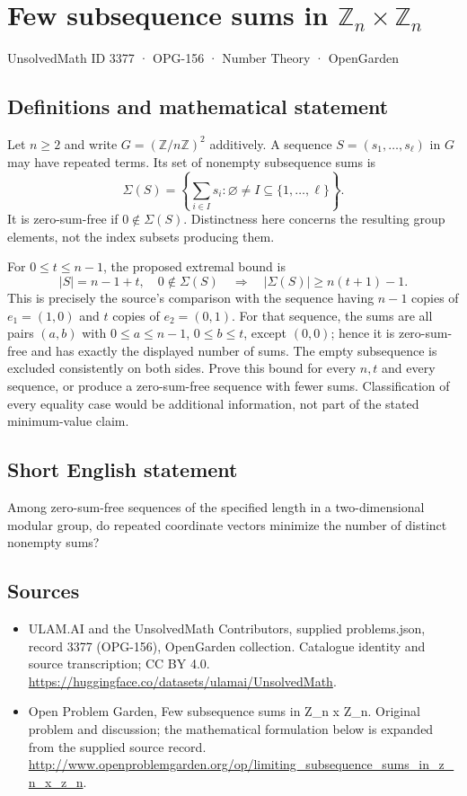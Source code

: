 \documentclass[11pt,a4paper]{article}
\begin{document}
\section*{Few subsequence sums in $\mathbb Z_n\times\mathbb Z_n$}\label{3377}
{\small UnsolvedMath ID 3377 · OPG-156 · Number Theory · OpenGarden}
\subsection{Definitions and mathematical statement}
Let $n\ge2$ and write $G=(\mathbb Z/n\mathbb Z)^2$ additively.
A sequence $S=(s_1,\ldots,s_\ell)$ in $G$ may have repeated terms.
Its set of nonempty subsequence sums is
\[
 \Sigma(S)=\left\{\sum_{i\in I}s_i:
                  \varnothing\ne I\subseteq\{1,\ldots,\ell\}\right\}.
\]
It is zero-sum-free if $0\notin\Sigma(S)$. Distinctness here concerns
the resulting group elements, not the index subsets producing them.

For $0\le t\le n-1$, the proposed extremal bound is
\[
 |S|=n-1+t,\quad 0\notin\Sigma(S)
           \quad\Longrightarrow\quad |\Sigma(S)|\ge n(t+1)-1.
\]
This is precisely the source's comparison with the sequence having
$n-1$ copies of $e_1=(1,0)$ and $t$ copies of $e_2=(0,1)$.
For that sequence, the sums are all pairs $(a,b)$ with
$0\le a\le n-1$, $0\le b\le t$, except $(0,0)$; hence it is
zero-sum-free and has exactly the displayed number of sums.
The empty subsequence is excluded consistently on both sides.
Prove this bound for every $n,t$ and every sequence, or produce a
zero-sum-free sequence with fewer sums. Classification of every
equality case would be additional information, not part of the stated
minimum-value claim.
\subsection{Short English statement}
Among zero-sum-free sequences of the specified length in a two-dimensional modular group, do repeated coordinate vectors minimize the number of distinct nonempty sums?
\subsection{Sources}
\begin{itemize}
\item[S1] ULAM.AI and the UnsolvedMath Contributors, supplied problems.json, record 3377 (OPG-156), OpenGarden collection. Catalogue identity and source transcription; CC BY 4.0.
\url{https://huggingface.co/datasets/ulamai/UnsolvedMath}.
\item[S2] Open Problem Garden, Few subsequence sums in Z\_n x Z\_n. Original problem and discussion; the mathematical formulation below is expanded from the supplied source record.
\url{http://www.openproblemgarden.org/op/limiting_subsequence_sums_in_z_n_x_z_n}.
\end{itemize}
\end{document}
